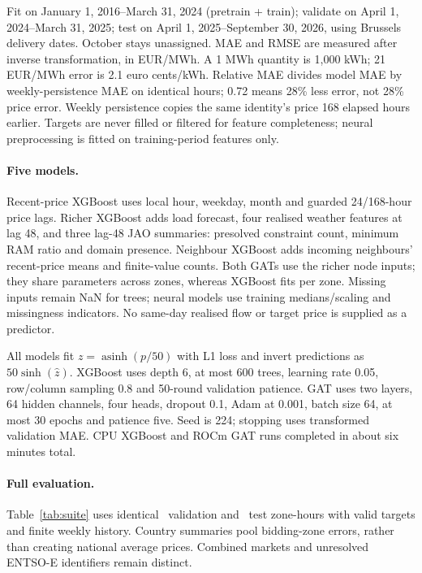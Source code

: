 \documentclass{article}
\begin{document}
Fit on January 1, 2016--March 31, 2024 (pretrain + train); validate on April 1,
2024--March 31, 2025; test on April 1, 2025--September 30, 2026, using Brussels
delivery dates. October stays unassigned. MAE and RMSE are measured after inverse
transformation, in EUR/MWh. A 1 MWh quantity is 1,000 kWh; 21 EUR/MWh error is 2.1 euro cents/kWh. Relative MAE divides model MAE by weekly-persistence MAE on identical hours; 0.72 means 28\% less error, not 28\% price error. Weekly persistence copies the same identity's price
168 elapsed hours earlier. Targets are never filled or filtered for feature
completeness; neural preprocessing is fitted on training-period features only.

\ifdefined\ControlledStudyComplete
\ControlledMethods
\else
\paragraph{Five models.}
Recent-price XGBoost uses local hour, weekday, month and guarded 24/168-hour
price lags. Richer XGBoost adds load forecast, four realised weather features
at lag 48, and three lag-48 JAO summaries: presolved constraint count, minimum
RAM ratio and domain presence. Neighbour XGBoost adds incoming neighbours'
recent-price means and finite-value counts. Both GATs use the richer node inputs;
they share parameters across zones, whereas XGBoost fits per zone. Missing inputs
remain NaN for trees; neural models use training medians/scaling and missingness
indicators. No same-day realised flow or target price is supplied as a predictor.

All models fit $z=\operatorname{asinh}(p/50)$ with L1 loss and invert predictions
as $50\sinh(\hat z)$. XGBoost uses depth 6, at most 600 trees, learning rate 0.05,
row/column sampling 0.8 and 50-round validation patience. GAT uses two layers,
64 hidden channels, four heads, dropout 0.1, Adam at 0.001, batch size 64,
at most 30 epochs and patience five. Seed is 224; stopping uses transformed
validation MAE. CPU XGBoost and ROCm GAT runs completed in about six minutes total.
\fi


\ifdefined\ControlledStudyComplete
\ControlledResults
\else
\paragraph{Full evaluation.}
Table~\ref{tab:suite} uses identical \SuiteValHours\ validation and
\SuiteTestHours\ test zone-hours with valid targets and finite weekly history.
Country summaries pool bidding-zone errors, rather than creating national average
prices. Combined markets and unresolved ENTSO-E identifiers remain distinct.
\begin{table}[!ht]
\centering\small
\caption{Matched MAE (EUR/MWh), lower is better. One seed, 49 market identities.}
\label{tab:suite}
\end{table}
\end{document}
